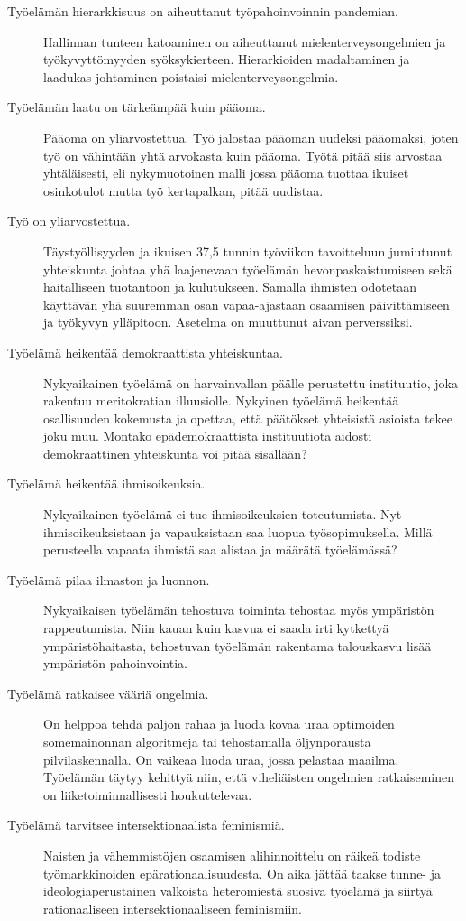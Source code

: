 \documentclass[nobib,finnish,oneside,openany,notoc,a4paper]{tufte-book}
\begin{document}
\begin{description}
    \item[Työelämän hierarkkisuus on aiheuttanut työpahoinvoinnin pandemian.] Hallinnan tunteen katoaminen on aiheuttanut mielenterveysongelmien ja työkyvyttömyyden syöksykierteen. Hierarkioiden madaltaminen ja laadukas johtaminen poistaisi mielenterveysongelmia.
    \item[Työelämän laatu on tärkeämpää kuin pääoma.] Pääoma on yliarvostettua. Työ jalostaa pääoman uudeksi pääomaksi, joten työ on vähintään yhtä arvokasta kuin pääoma. Työtä pitää siis arvostaa yhtäläisesti, eli nykymuotoinen malli jossa pääoma tuottaa ikuiset osinkotulot mutta työ kertapalkan, pitää uudistaa.
    \item[Työ on yliarvostettua.] Täystyöllisyyden ja ikuisen 37,5 tunnin työviikon tavoitteluun jumiutunut yhteiskunta johtaa yhä laajenevaan työelämän hevonpaskaistumiseen sekä haitalliseen tuotantoon ja kulutukseen. Samalla ihmisten odotetaan käyttävän yhä suuremman osan vapaa-ajastaan osaamisen päivittämiseen ja työkyvyn ylläpitoon. Asetelma on muuttunut aivan perverssiksi.
    \item[Työelämä heikentää demokraattista yhteiskuntaa.] Nykyaikainen työelämä on harvainvallan päälle perustettu instituutio, joka rakentuu meritokratian illuusiolle. Nykyinen työelämä heikentää osallisuuden kokemusta ja opettaa, että päätökset yhteisistä asioista tekee joku muu. Montako epädemokraattista instituutiota aidosti demokraattinen yhteiskunta voi pitää sisällään?
    \item[Työelämä heikentää ihmisoikeuksia.] Nykyaikainen työelämä ei tue ihmisoikeuksien toteutumista. Nyt ihmisoikeuksistaan ja vapauksistaan saa luopua työsopimuksella. Millä perusteella vapaata ihmistä saa alistaa ja määrätä työelämässä?
    \item[Työelämä pilaa ilmaston ja luonnon.] Nykyaikaisen työelämän tehostuva toiminta tehostaa myös ympäristön rappeutumista. Niin kauan kuin kasvua ei saada irti kytkettyä ympäristöhaitasta, tehostuvan työelämän rakentama talouskasvu lisää ympäristön pahoinvointia. 
    \item[Työelämä ratkaisee vääriä ongelmia.] On helppoa tehdä paljon rahaa ja luoda kovaa uraa optimoiden somemainonnan algoritmeja tai tehostamalla öljynporausta pilvilaskennalla. On vaikeaa luoda uraa, jossa pelastaa maailma. Työelämän täytyy kehittyä niin, että viheliäisten ongelmien ratkaiseminen on liiketoiminnallisesti houkuttelevaa.
    \item[Työelämä tarvitsee intersektionaalista feminismiä.] Naisten ja vähemmistöjen osaamisen alihinnoittelu on räikeä todiste työmarkkinoiden epärationaalisuudesta. On aika jättää taakse tunne- ja ideologiaperustainen valkoista heteromiestä suosiva työelämä ja siirtyä rationaaliseen intersektionaaliseen feminismiin.

\end{description}
\end{document}
